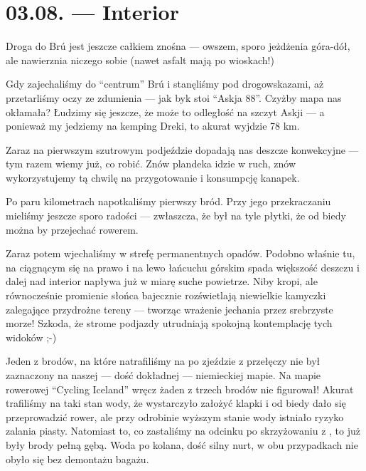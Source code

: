 \chapter*{03.08. --- Interior}

Droga do Brú jest jeszcze całkiem znośna --- owszem, sporo jeżdżenia góra-dół, ale nawierznia niczego sobie (nawet asfalt mają po wioskach!)

Gdy zajechaliśmy do “centrum” Brú i stanęliśmy pod drogowskazami, aż przetarliśmy oczy ze zdumienia --- jak byk stoi “Askja 88”. Czyżby mapa nas okłamała? Łudzimy się jeszcze, że może to odległość na szczyt Askji --- a ponieważ my jedziemy na kemping Dreki, to akurat wyjdzie 78 km.

Zaraz na pierwszym szutrowym podjeździe dopadają nas deszcze konwekcyjne --- tym razem wiemy już, co robić. Znów plandeka idzie w ruch, znów wykorzystujemy tą chwilę na przygotowanie i konsumpcję kanapek.

Po paru kilometrach napotkaliśmy pierwszy bród. Przy jego przekraczaniu mieliśmy jeszcze sporo radości --- zwłaszcza, że był na tyle płytki, że od biedy można by przejechać rowerem.

Zaraz potem wjechaliśmy w strefę permanentnych opadów. Podobno właśnie tu, na ciągnącym się na prawo i na lewo łańcuchu górskim spada większość deszczu i dalej nad interior napływa już w miarę suche powietrze. Niby kropi, ale równocześnie promienie słońca bajecznie rozświetlają niewielkie kamyczki zalegające przydrożne tereny --- tworząc wrażenie jechania przez srebrzyste morze! Szkoda, że strome podjazdy utrudniają spokojną kontemplację tych widoków ;-)


Jeden z brodów, na które natrafiliśmy na  po zjeździe z przełęczy nie był zaznaczony na naszej --- dość dokładnej --- niemieckiej mapie. Na mapie rowerowej “Cycling Iceland” wręcz żaden z trzech brodów nie figurował! Akurat trafiliśmy na taki stan wody, że wystarczyło założyć klapki i od biedy dało się przeprowadzić rower, ale przy odrobinie wyższym stanie wody istniało ryzyko zalania piasty. Natomiast to, co zastaliśmy na odcinku po skrzyżowaniu z , to już były brody pełną gębą. Woda po kolana, dość silny nurt, w obu przypadkach nie obyło się bez demontażu bagażu.



